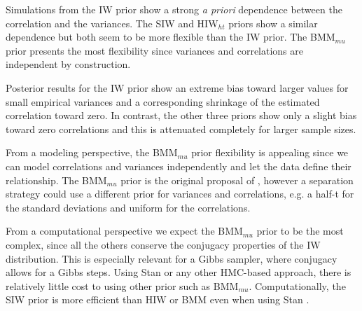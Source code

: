 \documentclass[12pt]{article}
\begin{document}
Simulations from the IW prior show a strong \emph{a priori} dependence between the correlation and the variances. The SIW and HIW$_{ht}$ priors show a similar dependence but both seem to be more flexible than the IW prior. The BMM$_{mu}$ prior presents the most flexibility since variances and correlations are independent by construction.

Posterior results for the IW prior show an extreme bias toward larger values for small empirical variances and a corresponding shrinkage of the estimated correlation toward zero. In contrast, the other three priors show only a slight bias toward zero correlations and this is attenuated completely for larger sample sizes.

From a modeling perspective, the BMM$_{mu}$ prior flexibility is appealing since we can model correlations and variances independently and let the data define their relationship.  The BMM$_{mu}$ prior is the original proposal of \cite{barnard2000}, however a separation strategy could use a different prior for variances and correlations, e.g. a half-t for the standard deviations and uniform for the correlations. 

From a computational perspective we expect the BMM$_{mu}$ prior to be the most complex, since all the others conserve the conjugacy properties of the IW distribution. This is especially relevant for a Gibbs sampler, where conjugacy allows for a Gibbs steps. Using Stan or any other HMC-based approach, there is relatively little cost to using other prior such as BMM$_{mu}$. 
Computationally, the SIW prior is more efficient than HIW or BMM even when using Stan \citep{CCalvarez}. 
\end{document}
